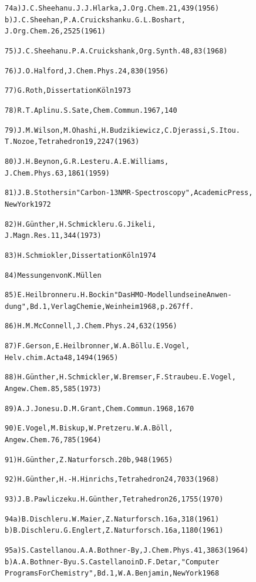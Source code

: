 \documentclass[a4paper,11pt]{article}
\begin{document}
\begin{alltt}
74 a) J.C.Sheehan u. J.J.Hlarka, J.Org.Chem. 21, 439 (1956)
   b) J.C.Sheehan, P.A.Cruickshank u. G.L.Boshart,
      J.Org.Chem. 26, 2525 (1961)

75)   J.C.Sheehan u. P.A.Cruickshank, Org.Synth. 48, 83 (1968)

76)   J.O.Halford, J.Chem.Phys. 24, 830 (1956)

77)   G.Roth, Dissertation Köln 1973

78)   R.T.Aplin u. S.Sate, Chem.Commun. 1967, 140

79)   J.M.Wilson, M.Ohashi, H.Budzikiewicz, C.Djerassi, S.Ito u.
      T.Nozoe, Tetrahedron 19, 2247 (1963)

80)   J.H.Beynon, G.R.Lester u. A.E.Williams,
      J.Chem.Phys. 63, 1861 (1959)

81)   J.B.Stothers in "Carbon-13 NMR-Spectroscopy", Academic Press,
      New York 1972

82)   H.Günther, H.Schmickler u. G.Jikeli,
      J.Magn.Res. 11, 344 (1973)

83)   H.Schmiokler, Dissertation Köln 1974

84)   Messungen von K.Müllen

85)   E.Heilbronner u. H.Bock in "Das HMO-Modell und seine Anwen-
      dung", Bd. 1, Verlag Chemie, Weinheim 1968, p. 267 ff.

86)   H.M.McConnell, J.Chem.Phys. 24, 632 (1956)

87)   F.Gerson, E.Heilbronner, W.A.Böll u. E.Vogel,
      Helv.chim.Acta 48, 1494 (1965)

88)   H.Günther, H.Schmickler, W.Bremser, F.Straube u. E.Vogel,
      Angew.Chem. 85, 585 (1973)

89)   A.J.Jones u. D.M.Grant, Chem.Commun. 1968, 1670

90)   E.Vogel, M.Biskup, W.Pretzer u. W.A.Böll,
      Angew.Chem. 76, 785 (1964)

91)   H.Günther, Z.Naturforsch. 20b, 948 (1965)
\newpage
{}


 92)   H.Günther, H.-H.Hinrichs, Tetrahedron 24, 7033 (1968)

 93)   J.B.Pawliczek u. H.Günther, Tetrahedron 26, 1755 (1970)

 94 a) B.Dischler u. W.Maier, Z.Naturforsch. 16a, 318 (1961)
    b) B.Dischler u. G.Englert, Z.Naturforsch. 16a, 1180 (1961)

 95 a) S.Castellano u. A.A.Bothner-By, J.Chem.Phys. 41, 3863 (1964)
    b) A.A.Bothner-By u. S.Castellano in D.F.Detar, "Computer
       Programs For Chemistry", Bd. 1, W.A.Benjamin, New York 1968


\end{alltt}
\end{document}
